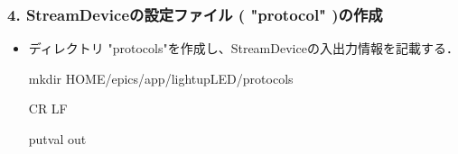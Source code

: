 \documentclass[letterpaper,10pt,dvipdfmx]{sphinxmanual}
\begin{document}
\subsubsection{4. StreamDeviceの設定ファイル ( "protocol" )の作成}
\label{\detokenize{epics/rst/example3__arduino_LEDcontrol01:streamdevice-protocol}}\begin{itemize}
\item {} 
ディレクトリ "protocols"を作成し、StreamDeviceの入出力情報を記載する．

\begin{sphinxVerbatim}[commandchars=\\\{\}]
\PYGZdl{} mkdir \PYGZdl{}HOME/epics/app/lightupLED/protocols
\end{sphinxVerbatim}
\def\sphinxLiteralBlockLabel{\label{\detokenize{epics/rst/example3__arduino_LEDcontrol01:id9}}}
\begin{sphinxVerbatim}[commandchars=\\\{\},numbers=left,firstnumber=1,stepnumber=1]
  CR LF

putval
  out 
\end{sphinxVerbatim}

\end{itemize}
\end{document}
